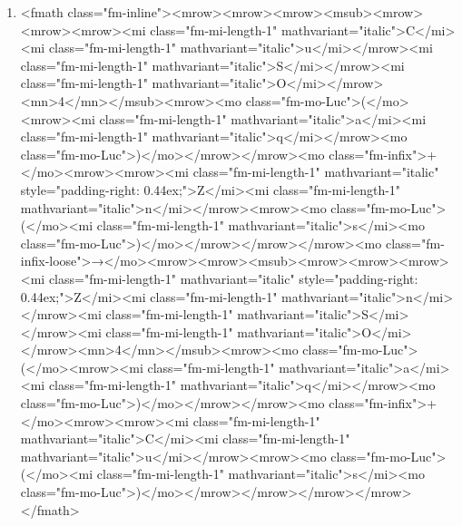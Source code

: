 \documentclass{article}
\begin{document}
\begin{enumerate}[label=(\alph*)]
\item  <fmath class="fm-inline"><mrow><mrow><mrow><msub><mrow><mrow><mrow><mi class="fm-mi-length-1" mathvariant="italic">C</mi><mi class="fm-mi-length-1" mathvariant="italic">u</mi></mrow><mi class="fm-mi-length-1" mathvariant="italic">S</mi></mrow><mi class="fm-mi-length-1" mathvariant="italic">O</mi></mrow><mn>4</mn></msub><mrow><mo class="fm-mo-Luc">(</mo><mrow><mi class="fm-mi-length-1" mathvariant="italic">a</mi><mi class="fm-mi-length-1" mathvariant="italic">q</mi></mrow><mo class="fm-mo-Luc">)</mo></mrow></mrow><mo class="fm-infix">+</mo><mrow><mrow><mi class="fm-mi-length-1" mathvariant="italic" style="padding-right: 0.44ex;">Z</mi><mi class="fm-mi-length-1" mathvariant="italic">n</mi></mrow><mrow><mo class="fm-mo-Luc">(</mo><mi class="fm-mi-length-1" mathvariant="italic">s</mi><mo class="fm-mo-Luc">)</mo></mrow></mrow></mrow><mo class="fm-infix-loose">→</mo><mrow><mrow><msub><mrow><mrow><mrow><mi class="fm-mi-length-1" mathvariant="italic" style="padding-right: 0.44ex;">Z</mi><mi class="fm-mi-length-1" mathvariant="italic">n</mi></mrow><mi class="fm-mi-length-1" mathvariant="italic">S</mi></mrow><mi class="fm-mi-length-1" mathvariant="italic">O</mi></mrow><mn>4</mn></msub><mrow><mo class="fm-mo-Luc">(</mo><mrow><mi class="fm-mi-length-1" mathvariant="italic">a</mi><mi class="fm-mi-length-1" mathvariant="italic">q</mi></mrow><mo class="fm-mo-Luc">)</mo></mrow></mrow><mo class="fm-infix">+</mo><mrow><mrow><mi class="fm-mi-length-1" mathvariant="italic">C</mi><mi class="fm-mi-length-1" mathvariant="italic">u</mi></mrow><mrow><mo class="fm-mo-Luc">(</mo><mi class="fm-mi-length-1" mathvariant="italic">s</mi><mo class="fm-mo-Luc">)</mo></mrow></mrow></mrow></mrow></fmath> 

\end{enumerate}
\end{document}
